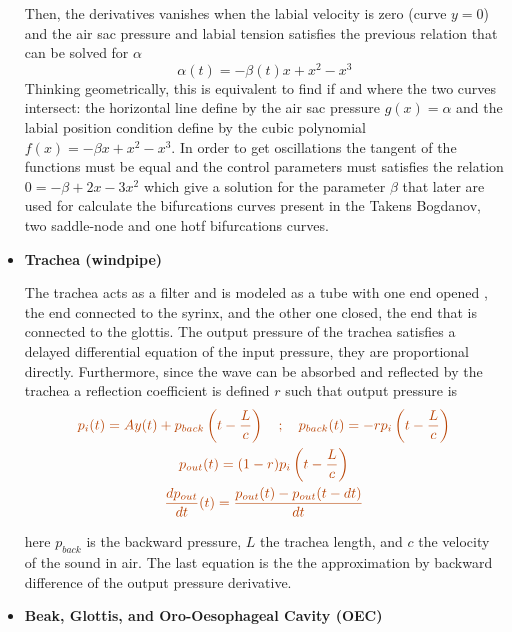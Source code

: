 \begin{itemize}
Then, the derivatives vanishes when the labial velocity is zero (curve $y=0$) and the air sac pressure and labial tension satisfies the previous relation that can be solved for $\alpha$
\begin{equation}\label{alpha_solve}
    \alpha (t) = -\beta (t) x  + x^2 - x^3 
\end{equation}
Thinking geometrically, this is equivalent to find if and where the two curves intersect: the horizontal line define by the air sac pressure $g(x)=\alpha$ and the labial position condition  define by the cubic polynomial $f(x)=-\beta x  + x^2 - x^3 $. In order to get oscillations the tangent of the functions must be equal and the control parameters must satisfies the relation $0=-\beta+2x-3x^2$ which give a solution for the parameter $\beta$ that later are used for calculate the bifurcations curves present in the Takens Bogdanov, two saddle-node and one hotf  bifurcations curves.



\item \textbf{Trachea (windpipe)}

The trachea acts as a filter and is modeled as a tube with one end opened \cite{trachea_birdsong}, the end connected to the syrinx, and the other one closed, the end that is connected to the glottis. The output pressure of the trachea satisfies a delayed differential equation of the input pressure, they are proportional directly. Furthermore, since the wave can be absorbed and reflected by the trachea a reflection coefficient is defined $r$ such that output pressure is 
\begin{gather}\label{trache_edos}
\color{myyellow} p_i (t) = A y(t) + p_{back}\left( t - \frac{L}{c} \right)\quad ; \quad p_{back} (t) = -r p_i\left( t - \frac{L}{c} \right)\\
\color{myyellow} p_{out} (t) = (1-r)p_i\left( t - \frac{L}{c} \right)\\
\color{myyellow} \frac{d p_{out}}{dt} (t) = \frac{p_{out}(t)- p_{out}(t-dt)}{dt}
\end{gather}

here $p_{back}$ is the backward pressure, $L$ the trachea length, and $c$ the velocity of the sound in air. The last equation is the the approximation by backward difference of the output pressure derivative.
    
    \item  \textbf{Beak, Glottis, and Oro-Oesophageal Cavity  (OEC)}
    

\end{itemize}
